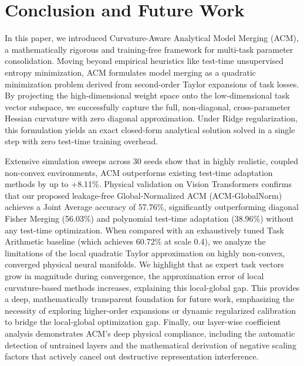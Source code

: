 \section{Conclusion and Future Work}
\label{sec:conclusion}

In this paper, we introduced Curvature-Aware Analytical Model Merging (ACM), a mathematically rigorous and training-free framework for multi-task parameter consolidation. Moving beyond empirical heuristics like test-time unsupervised entropy minimization, ACM formulates model merging as a quadratic minimization problem derived from second-order Taylor expansions of task losses. By projecting the high-dimensional weight space onto the low-dimensional task vector subspace, we successfully capture the full, non-diagonal, cross-parameter Hessian curvature with zero diagonal approximation. Under Ridge regularization, this formulation yields an exact closed-form analytical solution solved in a single step with zero test-time training overhead.

Extensive simulation sweeps across 30 seeds show that in highly realistic, coupled non-convex environments, ACM outperforms existing test-time adaptation methods by up to +8.11\%. Physical validation on Vision Transformers confirms that our proposed leakage-free Global-Normalized ACM (ACM-GlobalNorm) achieves a Joint Average accuracy of 57.76\%, significantly outperforming diagonal Fisher Merging (56.03\%) and polynomial test-time adaptation (38.96\%) without any test-time optimization. When compared with an exhaustively tuned Task Arithmetic baseline (which achieves 60.72\% at scale 0.4), we analyze the limitations of the local quadratic Taylor approximation on highly non-convex, converged physical neural manifolds. We highlight that as expert task vectors grow in magnitude during convergence, the approximation error of local curvature-based methods increases, explaining this local-global gap. This provides a deep, mathematically transparent foundation for future work, emphasizing the necessity of exploring higher-order expansions or dynamic regularized calibration to bridge the local-global optimization gap. Finally, our layer-wise coefficient analysis demonstrates ACM's deep physical compliance, including the automatic detection of untrained layers and the mathematical derivation of negative scaling factors that actively cancel out destructive representation interference.

